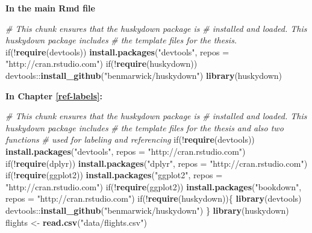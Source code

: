 \documentclass [11pt, proquest] {uwthesis}[2015/03/03]
\newenvironment{Shaded}{}{}
\newcommand{\KeywordTok}[1]{\textcolor[rgb]{0.00,0.44,0.13}{\textbf{{#1}}}}
\newcommand{\DataTypeTok}[1]{\textcolor[rgb]{0.56,0.13,0.00}{{#1}}}
\newcommand{\StringTok}[1]{\textcolor[rgb]{0.25,0.44,0.63}{{#1}}}
\newcommand{\CommentTok}[1]{\textcolor[rgb]{0.38,0.63,0.69}{\textit{{#1}}}}
\newcommand{\NormalTok}[1]{{#1}}
\begin{document}
\textbf{In the main Rmd file}
\begin{Shaded}
\begin{Highlighting}[]
\CommentTok{# This chunk ensures that the huskydown package is}
\CommentTok{# installed and loaded. This huskydown package includes}
\CommentTok{# the template files for the thesis.}
\NormalTok{if(!}\KeywordTok{require}\NormalTok{(devtools))}
  \KeywordTok{install.packages}\NormalTok{(}\StringTok{"devtools"}\NormalTok{, }\DataTypeTok{repos =} \StringTok{"http://cran.rstudio.com"}\NormalTok{)}
\NormalTok{if(!}\KeywordTok{require}\NormalTok{(huskydown))}
  \NormalTok{devtools::}\KeywordTok{install_github}\NormalTok{(}\StringTok{"benmarwick/huskydown"}\NormalTok{)}
\KeywordTok{library}\NormalTok{(huskydown)}
\end{Highlighting}
\end{Shaded}
\textbf{In Chapter \ref{ref-labels}:}
\begin{Shaded}
\begin{Highlighting}[]
\CommentTok{# This chunk ensures that the huskydown package is}
\CommentTok{# installed and loaded. This huskydown package includes}
\CommentTok{# the template files for the thesis and also two functions}
\CommentTok{# used for labeling and referencing}
\NormalTok{if(!}\KeywordTok{require}\NormalTok{(devtools))}
  \KeywordTok{install.packages}\NormalTok{(}\StringTok{"devtools"}\NormalTok{, }\DataTypeTok{repos =} \StringTok{"http://cran.rstudio.com"}\NormalTok{)}
\NormalTok{if(!}\KeywordTok{require}\NormalTok{(dplyr))}
    \KeywordTok{install.packages}\NormalTok{(}\StringTok{"dplyr"}\NormalTok{, }\DataTypeTok{repos =} \StringTok{"http://cran.rstudio.com"}\NormalTok{)}
\NormalTok{if(!}\KeywordTok{require}\NormalTok{(ggplot2))}
    \KeywordTok{install.packages}\NormalTok{(}\StringTok{"ggplot2"}\NormalTok{, }\DataTypeTok{repos =} \StringTok{"http://cran.rstudio.com"}\NormalTok{)}
\NormalTok{if(!}\KeywordTok{require}\NormalTok{(ggplot2))}
    \KeywordTok{install.packages}\NormalTok{(}\StringTok{"bookdown"}\NormalTok{, }\DataTypeTok{repos =} \StringTok{"http://cran.rstudio.com"}\NormalTok{)}
\NormalTok{if(!}\KeywordTok{require}\NormalTok{(huskydown))\{}
  \KeywordTok{library}\NormalTok{(devtools)}
  \NormalTok{devtools::}\KeywordTok{install_github}\NormalTok{(}\StringTok{"benmarwick/huskydown"}\NormalTok{)}
  \NormalTok{\}}
\KeywordTok{library}\NormalTok{(huskydown)}
\NormalTok{flights <-}\StringTok{ }\KeywordTok{read.csv}\NormalTok{(}\StringTok{"data/flights.csv"}\NormalTok{)}
\end{Highlighting}
\end{Shaded}
\end{document}
